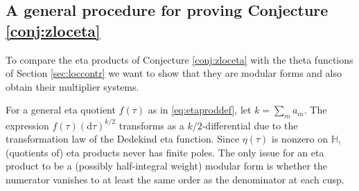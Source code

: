 \documentclass[11pt,a4paper]{amsart}
\theoremstyle{definition}
\begin{document}

\subsection{A general procedure for proving Conjecture \ref{conj:zloceta}}
To compare the eta products of Conjecture \ref{conj:zloceta} with the theta functions of Section \ref{sec:loccontr} we want to show that they are modular forms and also obtain their multiplier systems.

For a general eta quotient $f(\tau)$ as in \eqref{eq:etaproddef}, let $k=\sum_m{a_m}$. The expression $f(\tau)(\mathrm{d}\tau)^{k/2}$ transforms as a $k/2$-differential due to the transformation law of the Dedekind eta function. Since $\eta(\tau)$ is nonzero on $\mathbb{H}$, (quotients of) eta products never has finite poles. The only issue for an eta product to be a (possibly half-integral weight) modular form is whether the numerator vanishes to at least the same order as the denominator at each cusp. 
\end{document}
